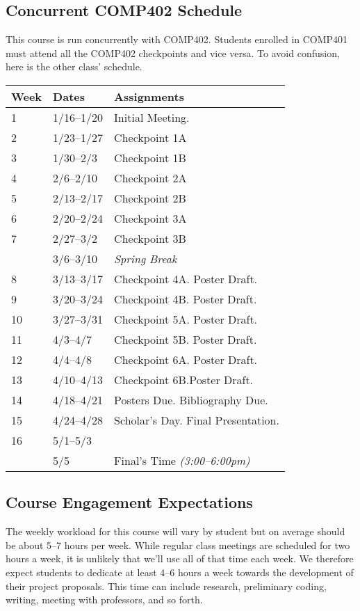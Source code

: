 \documentclass[10pt]{article}
\begin{document}
\subsection{Concurrent COMP402 Schedule}

This course is run concurrently with COMP402. Students enrolled in COMP401 must attend all the COMP402 checkpoints and vice versa. To avoid confusion, here is the other class' schedule.

\begin{center}
\begin{tabular}{lll}
Week & Dates & Assignments \\ \toprule
1 & 1/16--1/20 &  Initial Meeting.  \\
2 & 1/23--1/27 & Checkpoint 1A \\
3 & 1/30--2/3 & Checkpoint 1B \\
4 & 2/6--2/10 & Checkpoint 2A \\
5 & 2/13--2/17 & Checkpoint 2B \\
6 & 2/20--2/24 & Checkpoint 3A  \\
7 & 2/27--3/2 & Checkpoint 3B \\
 & 3/6--3/10 & \textit{Spring Break} \\
8 & 3/13--3/17  & Checkpoint 4A. Poster Draft. \\
9 & 3/20--3/24 & Checkpoint 4B. Poster Draft.   \\
10 & 3/27--3/31 & Checkpoint 5A. Poster Draft. \\
11 & 4/3--4/7 &  Checkpoint 5B. Poster Draft. \\
12 & 4/4--4/8 &  Checkpoint 6A. Poster Draft.   \\
13 & 4/10--4/13 & Checkpoint 6B.Poster Draft. \\
14 & 4/18--4/21 & Posters Due. Bibliography Due.  \\
15 & 4/24--4/28 & Scholar's Day. Final Presentation. \\
16 & 5/1--5/3 &   \\ \midrule
  & 5/5 & Final's Time \textit{(3:00--6:00pm)}  \\
\end{tabular}
\end{center}


\subsection{Course Engagement Expectations}

The weekly workload for this course will vary by student but on average should be about 5--7 hours per week.  While regular class meetings are scheduled for two hours a week, it is unlikely that we'll use all of that time each week.  We therefore expect students to dedicate at least 4--6 hours a week towards the development of their project proposals.  This time can include research, preliminary coding, writing, meeting with professors, and so forth.
\end{document}
